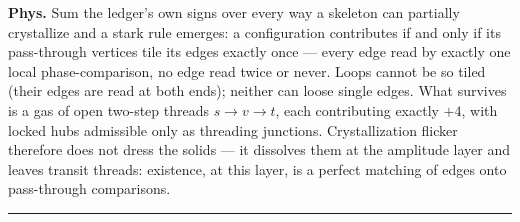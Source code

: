 \begin{theorem}
\textbf{Phys.} Sum the ledger's own signs over every way a skeleton can partially crystallize and a stark rule emerges: a configuration contributes if and only if its pass-through vertices tile its edges exactly once — every edge read by exactly one local phase-comparison, no edge read twice or never. Loops cannot be so tiled (their edges are read at both ends); neither can loose single edges. What survives is a gas of open two-step threads $s\to v\to t$, each contributing exactly $+4$, with locked hubs admissible only as threading junctions. Crystallization flicker therefore does not dress the solids — it dissolves them at the amplitude layer and leaves transit threads: existence, at this layer, is a perfect matching of edges onto pass-through comparisons.

\vspace{2pt}\noindent\rule{\textwidth}{0.4pt}\vspace{2pt}

\end{theorem}

